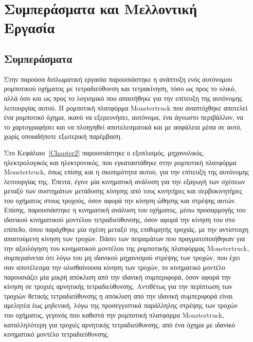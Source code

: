 
\chapter{Συμπεράσματα και Μελλοντική Εργασία} %

\label{Chapter6} %

\section{Συμπεράσματα}
Στην παρούσα διπλωματική εργασία παρουσιάστηκε η ανάπτυξη ενός αυτόνομου ρομποτικού οχήματος με  τετραδιεύθυνση και τετρακίνηση, τόσο ως προς το υλικό, αλλά όσο και ως προς το λογισμικό που απαιτήθηκε για την επίτευξη της αυτόνομης λειτουργίας αυτού. Η ρομποτική πλατφόρμα Monstertruck που αναπτύχθηκε αποτελεί ένα ρομποτικό όχημα, ικανό να εξερευνήσει, αυτόνομα, ένα άγνωστο περιβάλλον, να το χαρτογραφήσει και να πλοηγηθεί αποτελεσματικά και με ασφάλεια μέσα σε αυτό, χωρίς οποιαδήποτε εξωτερική παρέμβαση.

\bigskip
Στο Kεφάλαιο~\ref{Chapter2} παρουσιάστηκε ο εξοπλισμός, μηχανολικός, ηλεκτρολογικός και ηλεκτρονικός, που εγκαταστάθηκε στην ρομποτική πλατφόρμα Monstertruck, όπως επίσης και η σκοπιμότητα αυτού, για την επίτευξη της αυτόνομης λειτουργίας της. Έπειτα, έγινε μία κινηματική ανάλυση για την εξαγωγή των σχέσεων μεταξύ των συστημάτων μετάδοσης κίνησης από τους κινητήρες και σερβοκινητήρες του οχήματος στους τροχούς, όσον αφορά την κίνηση ώθησης και στρέψης αυτών. Επίσης, παρουσιάστηκε η κινηματική ανάλυση του οχήματος, μέσω προσαρμογής του ιδανικού κινηματικού μοντέλου τετραδιεύθυνσης, όσον αφορά την κίνηση του στο επίπεδο, όπου παράχθηκε μία σχέση μεταξύ της επιθυμητής τροχιάς, με την αντίστοιχη απαιτούμενη κίνηση των τροχών. Βάσει των πειραμάτων που πραγματοποιήθηκαν για την αξιολόγηση του κινηματικού μοντέλου της ρομποτικής πλατφόρμας Monstertruck, συμπεραίνεται ότι λόγω του μη ιδανικού μηχανισμού στρέψης των τροχών, που έχει σαν αποτέλεσμα την ολισθαίνουσα κίνηση των τροχών, το κινηματικό μοντέλο παρουσιάζει μία μικρή απόκλιση από την ιδανική συμπεριφορά, όσον αφορά την κίνηση σε τροχιές αρνητικής τετραδιεύθυνσης. Aντιθέτως για την περίπτωση των τροχιών θετικής τετραδιεύθυνσης η απόκλιση από την ιδανική συμπεριφορά είναι αμελητέα έως μηδενική, λόγω της προσεγγιστικά παράλληλης στρέψης των τροχών του οχήματος, γεγονός που καθιστά την ρομποτική πλατφόρμα Monstertruck, καταλληλότερη για τροχιές αρνητικής τετραδιεύθυνσης, από ένα όχημα με ιδανικό κινηματικό μοντέλο τετραδιεύθυνσης.

